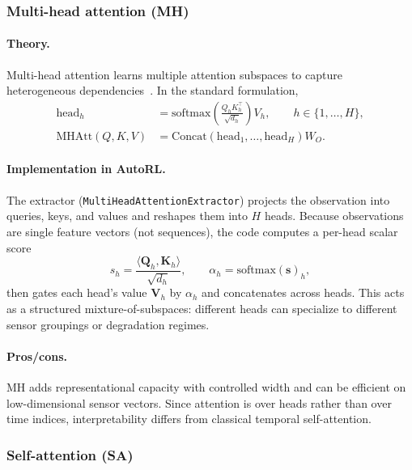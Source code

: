 \documentclass[11pt]{article}
\begin{document}
\subsubsection{Multi-head attention (MH)}
\paragraph{Theory.}
Multi-head attention learns multiple attention subspaces to capture heterogeneous dependencies~\cite{Vaswani2017Attention}. In the standard formulation,
\begin{align}
  \mathrm{head}_h &= \mathrm{softmax}\!\left(\frac{Q_hK_h^\top}{\sqrt{d_h}}\right)V_h,\qquad h\in\{1,\dots,H\},\\
  \mathrm{MHAtt}(Q,K,V) &= \mathrm{Concat}(\mathrm{head}_1,\dots,\mathrm{head}_H)W_O.
\end{align}

\paragraph{Implementation in AutoRL.}
The extractor (\texttt{MultiHeadAttentionExtractor}) projects the observation into queries, keys, and values and reshapes them into $H$ heads. Because observations are single feature vectors (not sequences), the code computes a per-head scalar score
\begin{equation}
  s_h = \frac{\langle \mathbf{Q}_h, \mathbf{K}_h\rangle}{\sqrt{d_h}},\qquad
  \alpha_h = \mathrm{softmax}(\mathbf{s})_h,
\end{equation}
then gates each head's value $\mathbf{V}_h$ by $\alpha_h$ and concatenates across heads. This acts as a structured mixture-of-subspaces: different heads can specialize to different sensor groupings or degradation regimes.

\paragraph{Pros/cons.}
MH adds representational capacity with controlled width and can be efficient on low-dimensional sensor vectors. Since attention is over heads rather than over time indices, interpretability differs from classical temporal self-attention.

\subsubsection{Self-attention (SA)}
\end{document}
